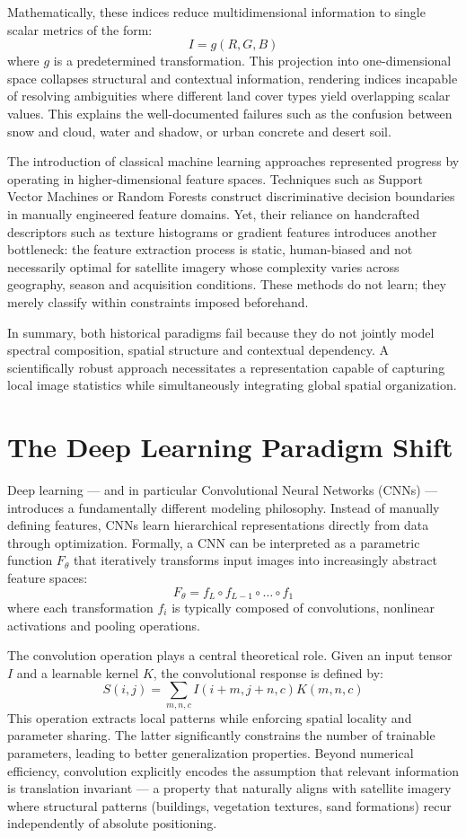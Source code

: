 \documentclass[12pt,a4paper]{report}
\begin{document}
Mathematically, these indices reduce multidimensional information to single scalar metrics of the form:
\[
I = g(R,G,B)
\]
where $g$ is a predetermined transformation. This projection into one-dimensional space collapses structural and contextual information, rendering indices incapable of resolving ambiguities where different land cover types yield overlapping scalar values. This explains the well-documented failures such as the confusion between snow and cloud, water and shadow, or urban concrete and desert soil.

The introduction of classical machine learning approaches represented progress by operating in higher-dimensional feature spaces. Techniques such as Support Vector Machines or Random Forests construct discriminative decision boundaries in manually engineered feature domains. Yet, their reliance on handcrafted descriptors such as texture histograms or gradient features introduces another bottleneck: the feature extraction process is static, human-biased and not necessarily optimal for satellite imagery whose complexity varies across geography, season and acquisition conditions. These methods do not learn; they merely classify within constraints imposed beforehand.

In summary, both historical paradigms fail because they do not jointly model spectral composition, spatial structure and contextual dependency. A scientifically robust approach necessitates a representation capable of capturing local image statistics while simultaneously integrating global spatial organization.

\section{The Deep Learning Paradigm Shift}

Deep learning — and in particular Convolutional Neural Networks (CNNs) — introduces a fundamentally different modeling philosophy. Instead of manually defining features, CNNs learn hierarchical representations directly from data through optimization. Formally, a CNN can be interpreted as a parametric function $F_\theta$ that iteratively transforms input images into increasingly abstract feature spaces:
\[
F_\theta = f_L \circ f_{L-1} \circ \dots \circ f_1
\]
where each transformation $f_i$ is typically composed of convolutions, nonlinear activations and pooling operations.

The convolution operation plays a central theoretical role. Given an input tensor $I$ and a learnable kernel $K$, the convolutional response is defined by:
\[
S(i,j)=\sum_{m,n,c} I(i+m,j+n,c)K(m,n,c)
\]
This operation extracts local patterns while enforcing spatial locality and parameter sharing. The latter significantly constrains the number of trainable parameters, leading to better generalization properties. Beyond numerical efficiency, convolution explicitly encodes the assumption that relevant information is translation invariant — a property that naturally aligns with satellite imagery where structural patterns (buildings, vegetation textures, sand formations) recur independently of absolute positioning.
\end{document}
